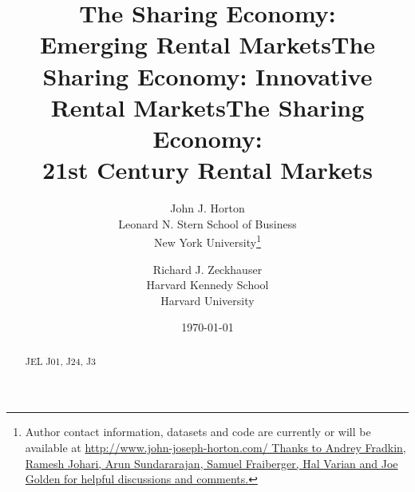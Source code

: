 \documentclass[11pt]{article}
\newcommand{\important}[1]{\textcolor{red}{\textbf{#1}}}
\newcommand{\important}[1]{#1}
\begin{document}
 


\title{The Sharing Economy: \\ Emerging Rental Markets}
\title{The Sharing Economy: Innovative Rental Markets}
\title{The Sharing Economy:\\ 21st Century Rental Markets}


\date{\today}

\author{John J. Horton \\ Leonard N. Stern School of Business \\ New
  York University\footnote{Author contact information, datasets and
    code are currently or will be available at
    \href{http://www.john-joseph-horton.com/}{http://www.john-joseph-horton.com/
    Thanks to Andrey Fradkin, Ramesh Johari, Arun Sundararajan, Samuel Fraiberger, Hal Varian and Joe Golden for helpful discussions and comments.}}
  \and 
  Richard J. Zeckhauser \\ Harvard Kennedy School \\ Harvard University
}
\maketitle


\begin{abstract} 
\newline \newline 
\noindent JEL J01, J24, J3 
\end{abstract} 
\end{document}

